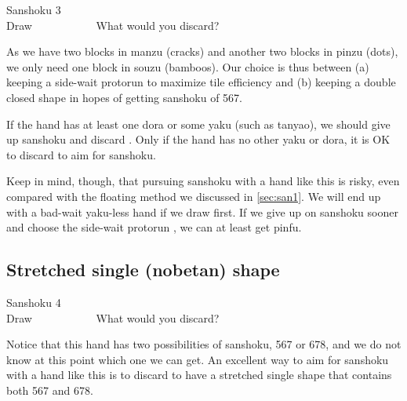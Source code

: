 \begin{itembox}[r]{{\jap Sanshoku} 3}
\bp
{}~\\
\hfill\footnotesize{Draw~~~~~~~~~~~}
\ep
\vspace{-17pt}What would you discard? \vspace{-5pt}
\end{itembox}
\noindent
As we have two blocks in {\jap manzu} (cracks) and another two blocks in {\jap pinzu} (dots), we only need one block in {\jap souzu} (bamboos). Our choice is thus between (a) keeping a side-wait protorun {\LARGE{}} to maximize tile efficiency and (b) keeping a double closed shape {\LARGE{}} in hopes of getting {\jap sanshoku} of 567. 

\bigskip
If the hand has at least one {\jap dora} or some {\jap yaku} (such as {\jap tanyao}), we should give up {\jap sanshoku} and discard {\LARGE{}}. Only if the hand has no other {\jap yaku} or {\jap dora}, it is OK to discard {\LARGE{}} to aim for {\jap sanshoku}. 

\bigskip
Keep in mind, though, that pursuing {\jap sanshoku} with a hand like this is risky, even compared with the floating method we discussed in \ref{sec:san1}. We will end up with a bad-wait {\jap yaku}-less hand if we draw {\LARGE{}} first. If we give up on {\jap sanshoku} sooner and choose the side-wait protorun {\LARGE{}}, we can at least get {\jap pinfu}. 

\newpage
\subsection{Stretched single ({\jap nobetan}) shape}\label{sec:san4}
\begin{itembox}[r]{{\jap Sanshoku} 4}
\bp
{}~\\
\hfill\footnotesize{Draw~~~~~~~~~~~}
\ep
\vspace{-17pt}What would you discard? \vspace{-5pt}
\end{itembox}
\noindent
Notice that this hand has two possibilities of {\jap sanshoku}, 567 or 678, and we do not know at this point which one we can get. An excellent way to aim for {\jap sanshoku} with a hand like this is to discard {\LARGE{}} to have a stretched single shape {\LARGE{}} that contains both 567 and 678. 

